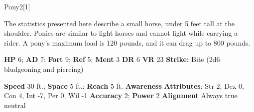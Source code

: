   \begin{monsection}{Pony}{2}[1]
    \vspace{-1em}\vspace{-1em}
    \vspace{0em}

    
      The statistics presented here describe a small horse, under 5 feet tall at the shoulder.
      Ponies are similar to light horses and cannot fight while carrying a rider.
      A pony's maximum load is 120 pounds, and it can drag up to 800 pounds.
    
    

    \begin{spellcontent}
      \begin{spelltargetinginfo}
        \pari \textbf{HP} 6;
          \textbf{AD} 7;
          \textbf{Fort} 9;
          \textbf{Ref} 5;
          \textbf{Ment} 3
        \pari \textbf{DR} 6
        \pari \textbf{VR} 23
        \pari \textbf{Strike:}
            Bite  (2d6 bludgeoning and piercing)
      \end{spelltargetinginfo}
    \end{spellcontent}
    \begin{monsterfooter}
      \pari \textbf{Speed} 30 ft.;
        \textbf{Space} 5 ft.;
        \textbf{Reach} 5 ft.
      \pari \textbf{Awareness} 
      \pari \textbf{Attributes}:
        Str 2, Dex 0,
        Con 4, Int -7,
        Per 0, Wil -1
      \pari \textbf{Accuracy} 2;
        \textbf{Power} 2
      \pari \textbf{Alignment} Always true neutral
    \end{monsterfooter}
  \end{monsection}
  
